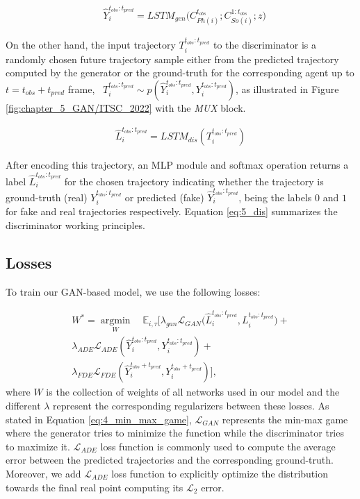 \begin{eqnarray}
	\label{eq:5_gen_dec}
	& \hat{Y}_i^{t_{obs}:t_{pred}} = LSTM_{gen}\big(C_{Ph(i)}^{t_{obs}}; C_{So(i)}^{1:t_{obs}}; z\big)
\end{eqnarray}

On the other hand, the input trajectory $T_i^{t_{obs}:t_{pred}}$ to the discriminator is a randomly chosen future trajectory sample either from the predicted trajectory computed by the generator or the ground-truth for the corresponding agent up to $t = t_{obs} + t_{pred}$ frame, \ie \ $T_i^{t_{obs}:t_{pred}}\sim p(\hat{Y}_i^{t_{obs}:t_{pred}},Y_i^{t_{obs}:t_{pred}})$, as illustrated in Figure \ref{fig:chapter_5_GAN/ITSC_2022} with the \textit{MUX} block.

\begin{eqnarray}
	\label{eq:5_dis}
	\hat{L}_{i}^{t_{obs}:t_{pred}} = LSTM_{dis}(T_i^{t_{obs}:t_{pred}})
\end{eqnarray}

After encoding this trajectory, an \ac{MLP} module and softmax operation returns a label $\hat{L}_{i}^{t_{obs}:t_{pred}}$ for the chosen trajectory indicating whether the trajectory is ground-truth (real) $Y_i^{t_{obs}:t_{pred}}$ or predicted (fake) $\hat{Y}_i^{t_{obs}:t_{pred}}$, being the labels $0$ and $1$ for fake and real trajectories respectively. Equation \ref{eq:5_dis} summarizes the discriminator working principles. 

\subsection{Losses}
\label{subsec:5_losses}

To train our \ac{GAN}-based model, we use the following losses:

\begin{eqnarray}
	\label{eq:obj}
	W^* =\operatorname*{argmin}_W \quad\mathbb{E}_{i,\tau}[\lambda_{gan} \mathcal{L}_{GAN}\big(\hat{L}_{i}^{t_{obs}:t_{pred}}, L_{i}^{t_{obs}:t_{pred}} \big)+ \nonumber\\
	\lambda_{ADE} \mathcal{L}_{ADE}(\hat{Y}_i^{t_{obs}:t_{pred}},Y_i^{t_{obs}:t_{pred}})+ \nonumber\\
	\lambda_{FDE} \mathcal{L}_{FDE}(\hat{Y}_i^{t_{obs}+t_{pred}},Y_i^{t_{obs}+t_{pred}})],
\end{eqnarray}
%
where $W$ is the collection of weights of all networks used in our model and the different $\lambda$ represent the corresponding regularizers between these losses. As stated in Equation \ref{eq:4_min_max_game}, $\mathcal{L}_{GAN}$ represents the min-max game where the generator tries to minimize the function while the discriminator tries to maximize it. $\mathcal{L}_{ADE}$ loss function is commonly used to compute the average error between the predicted trajectories and the corresponding ground-truth. Moreover, we add $\mathcal{L}_{ADE}$ loss function to explicitly optimize the distribution towards the final real point computing its $\mathcal{L}_2$ error.

